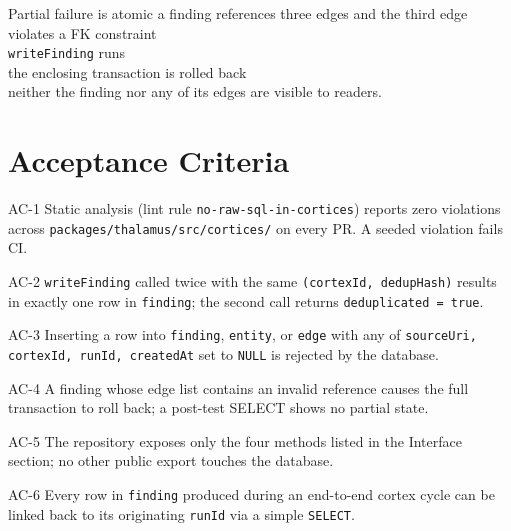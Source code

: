 \begin{scenario}{Partial failure is atomic}
\Given a finding references three edges and the third edge violates a FK constraint \\
\When \texttt{writeFinding} runs \\
\Then the enclosing transaction is rolled back \\
\And neither the finding nor any of its edges are visible to readers.
\end{scenario}

\section{Acceptance Criteria}

\begin{ac}{AC-1}
Static analysis (lint rule \texttt{no-raw-sql-in-cortices}) reports zero violations across
\texttt{packages/thalamus/src/cortices/} on every PR. A seeded violation fails CI.
\end{ac}

\begin{ac}{AC-2}
\texttt{writeFinding} called twice with the same \texttt{(cortexId, dedupHash)} results in
exactly one row in \texttt{finding}; the second call returns \texttt{deduplicated = true}.
\end{ac}

\begin{ac}{AC-3}
Inserting a row into \texttt{finding}, \texttt{entity}, or \texttt{edge} with any of
\texttt{sourceUri, cortexId, runId, createdAt} set to \texttt{NULL} is rejected by the
database.
\end{ac}

\begin{ac}{AC-4}
A finding whose edge list contains an invalid reference causes the full transaction to roll
back; a post-test SELECT shows no partial state.
\end{ac}

\begin{ac}{AC-5}
The repository exposes only the four methods listed in the Interface section; no other
public export touches the database.
\end{ac}

\begin{ac}{AC-6}
Every row in \texttt{finding} produced during an end-to-end cortex cycle can be linked back
to its originating \texttt{runId} via a simple \texttt{SELECT}.
\end{ac}

